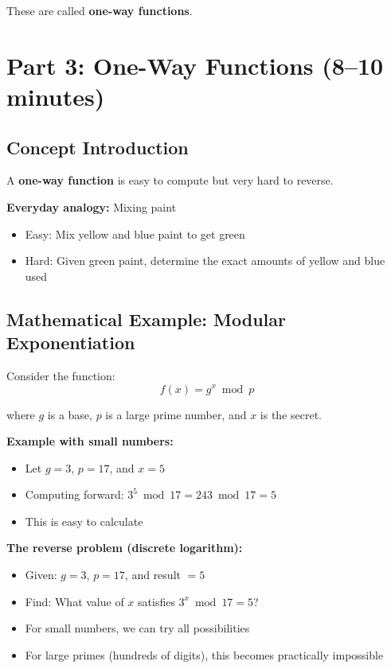\documentclass[11pt]{article}
\begin{document}
These are called \textbf{one-way functions}.

\section{Part 3: One-Way Functions (8--10 minutes)}

\subsection*{Concept Introduction}
A \textbf{one-way function} is easy to compute but very hard to reverse.

\textbf{Everyday analogy:} Mixing paint
\begin{itemize}
    \item Easy: Mix yellow and blue paint to get green
    \item Hard: Given green paint, determine the exact amounts of yellow and blue used
\end{itemize}

\subsection*{Mathematical Example: Modular Exponentiation}
Consider the function:
\[
f(x) = g^x \bmod p
\]

where $g$ is a base, $p$ is a large prime number, and $x$ is the secret.

\vspace{0.3cm}

\textbf{Example with small numbers:}
\begin{itemize}
    \item Let $g = 3$, $p = 17$, and $x = 5$
    \item Computing forward: $3^5 \bmod 17 = 243 \bmod 17 = 5$
    \item This is easy to calculate
\end{itemize}

\textbf{The reverse problem (discrete logarithm):}
\begin{itemize}
    \item Given: $g = 3$, $p = 17$, and result $= 5$
    \item Find: What value of $x$ satisfies $3^x \bmod 17 = 5$?
    \item For small numbers, we can try all possibilities
    \item For large primes (hundreds of digits), this becomes practically impossible
\end{itemize}
\end{document}
